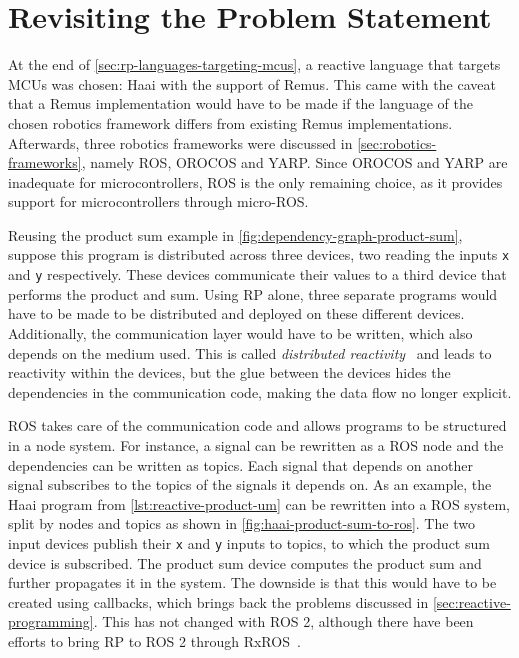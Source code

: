 \documentclass[a4paper]{book}
\begin{document}
\section{Revisiting the Problem Statement}
\label{sec:revisiting-the-problem-statement}
At the end of \cref{sec:rp-languages-targeting-mcus}, a reactive language that
targets MCUs was chosen: Haai with the support of Remus. This came with the
caveat that a Remus implementation would have to be made if the language of the
chosen robotics framework differs from existing Remus implementations.
Afterwards, three robotics frameworks were discussed in
\cref{sec:robotics-frameworks}, namely ROS, OROCOS and YARP. Since OROCOS and
YARP are inadequate for microcontrollers, ROS is the only remaining choice, as
it provides support for microcontrollers through micro-ROS.
\par
Reusing the product sum example in \cref{fig:dependency-graph-product-sum},
suppose this program is distributed across three devices, two reading the inputs
\texttt{x} and \texttt{y} respectively. These devices communicate their values
to a third device that performs the product and sum. Using RP alone, three
separate programs would have to be made to be distributed and deployed on these
different devices. Additionally, the communication layer would have to be
written, which also depends on the medium used. This is called
\textit{distributed reactivity}~\cite{surveyRP2024} and leads to reactivity
within the devices, but the glue between the devices hides the dependencies in
the communication code, making the data flow no longer explicit.
\par
ROS takes care of the communication code and allows programs to be structured in
a node system. For instance, a signal can be rewritten as a ROS node and the
dependencies can be written as topics. Each signal that depends on another
signal subscribes to the topics of the signals it depends on. As an example, the
Haai program from \cref{lst:reactive-product-um} can be rewritten into a ROS
system, split by nodes and topics as shown in
\cref{fig:haai-product-sum-to-ros}. The two input devices publish their
\texttt{x} and \texttt{y} inputs to topics, to which the product sum device is
subscribed. The product sum device computes the product sum and further
propagates it in the system. The downside is that this would have to be created
using callbacks, which brings back the problems discussed in
\cref{sec:reactive-programming}. This has not changed with ROS 2, although there
have been efforts to bring RP to ROS 2 through RxROS~\cite{Larsen2021}.
\end{document}
